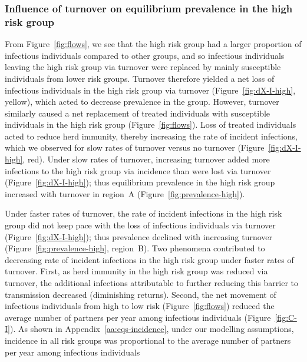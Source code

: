 \subsubsection{Influence of turnover on equilibrium prevalence in the high risk group}
\label{sss:res-prev-high}
From Figure~\ref{fig:flows},
we see that the high risk group
had a larger proportion of infectious individuals compared to other groups,
and so infectious individuals leaving the high risk group via turnover
were replaced by mainly susceptible individuals from lower risk groups.
Turnover therefore yielded
a net loss of infectious individuals in the high risk group via turnover
(Figure~\ref{fig:dX-I-high}, yellow),
which acted to decrease prevalence in the group.
However, turnover similarly caused a net replacement of
treated individuals with susceptible individuals in the high risk group
(Figure~\ref{fig:flows}).
Loss of treated individuals acted to reduce herd immunity,
thereby increasing the rate of incident infections,
which we observed for slow rates of turnover versus no turnover
(Figure~\ref{fig:dX-I-high}, red).
Under slow rates of turnover, increasing turnover
added more infections to the high risk group via incidence
than were lost via turnover
(Figure~\ref{fig:dX-I-high});
thus equilibrium prevalence in the high risk group
increased with turnover in region~A
(Figure~\ref{fig:prevalence-high}).
\par
Under faster rates of turnover,
the rate of incident infections in the high risk group did not keep pace with
the loss of infectious individuals via turnover
(Figure~\ref{fig:dX-I-high});
thus prevalence declined with increasing turnover
(Figure~\ref{fig:prevalence-high}, region~B).
Two phenomena contributed to decreasing rate of incident infections
in the high risk group under faster rates of turnover.
First, as herd immunity in the high risk group was reduced via turnover,
the additional infections attributable to
further reducing this barrier to transmission decreased
(diminishing returns).
Second, the net movement of infectious individuals
from high to low risk (Figure~\ref{fig:flows}) reduced
the average number of partners per year among infectious individuals
(Figure~\ref{fig:C-I}).
As shown in Appendix~\ref{aa:eqs-incidence},
under our modelling assumptions,
incidence in all risk groups was proportional to
the average number of partners per year among infectious individuals
